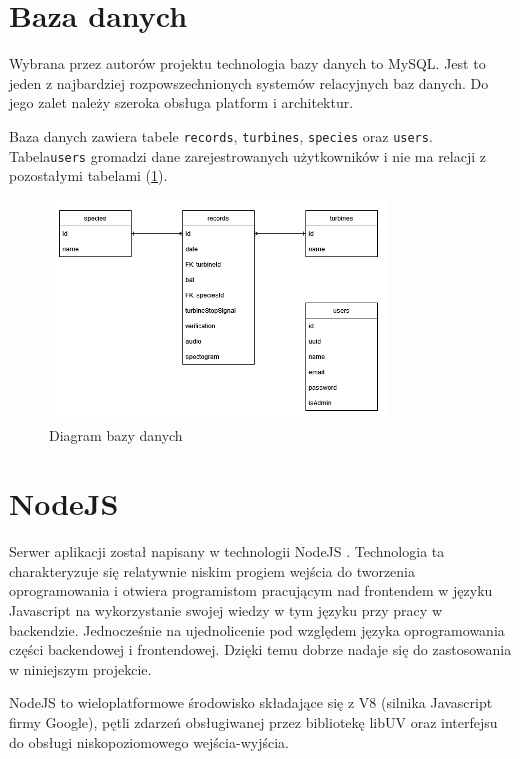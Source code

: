 \documentclass{sprz}
\begin{document}
\section{Baza danych}

Wybrana przez autorów projektu technologia bazy danych to MySQL. Jest to jeden z najbardziej rozpowszechnionych systemów relacyjnych baz danych. Do jego zalet należy szeroka obsługa platform i architektur.

Baza danych zawiera tabele \verb|records|, \verb|turbines|, \verb|species| oraz \verb|users|. Tabela\verb|users| gromadzi dane zarejestrowanych użytkowników i nie ma relacji z pozostałymi tabelami (\ref{img:db_diagram}).

\begin{figure}[h]
  \centering
  \includegraphics[width=0.8\textwidth]{sprz/db_diagram}
  \caption{Diagram bazy danych}
  \label{img:db_diagram}
\end{figure}

\section{NodeJS}

Serwer aplikacji został napisany w technologii NodeJS \cite{nodejs}. Technologia ta charakteryzuje się relatywnie niskim progiem wejścia do tworzenia oprogramowania i otwiera programistom pracującym nad frontendem w języku Javascript na wykorzystanie swojej wiedzy w tym języku przy pracy w backendzie. Jednocześnie na ujednolicenie pod względem języka oprogramowania części backendowej i frontendowej. Dzięki temu dobrze nadaje się do zastosowania w niniejszym projekcie.

NodeJS to wieloplatformowe środowisko składające się z V8 (silnika Javascript firmy Google), pętli zdarzeń obsługiwanej przez bibliotekę libUV oraz interfejsu do obsługi niskopoziomowego wejścia-wyjścia.
\end{document}
